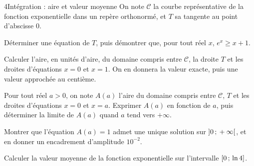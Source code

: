 \begin{exoBac}{4}{Intégration : aire et valeur moyenne}
On note $\mathcal{C}$ la courbe représentative de la fonction exponentielle dans un repère orthonormé, et $T$ sa tangente au point
d'abscisse $0$.
\begin{questions}
  \item Déterminer une équation de $T$, puis démontrer que, pour tout réel $x$, $e^{x}\geq x+1$.
  \item Calculer l'aire, en unités d'aire, du domaine compris entre $\mathcal{C}$, la droite $T$ et les droites d'équations $x=0$ et $x=1$.
    On en donnera la valeur exacte, puis une valeur approchée au centième.
  \item Pour tout réel $a>0$, on note $A(a)$ l'aire du domaine compris entre $\mathcal{C}$, $T$ et les droites d'équations $x=0$ et $x=a$.
    Exprimer $A(a)$ en fonction de $a$, puis déterminer la limite de $A(a)$ quand $a$ tend vers $+\infty$.
  \item Montrer que l'équation $A(a)=1$ admet une unique solution sur $\mathopen{]}0\,{;}\,+\infty\mathclose{[}$, et en donner un encadrement d'amplitude $10^{-2}$.
  \item Calculer la valeur moyenne de la fonction exponentielle sur l'intervalle $\mathopen{[}0\,{;}\,\ln4\mathclose{]}$.
\end{questions}
\end{exoBac}
